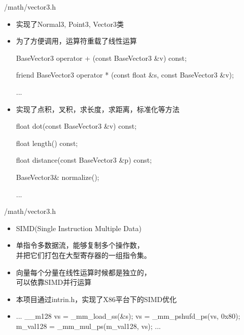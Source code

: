 \documentclass{beamer}
\begin{document}
\begin{frame} {/math/vector3.h}
\begin{itemize} [<+->]
\item 实现了Normal3, Point3, Vector3类
\item 为了方便调用，运算符重载了线性运算
\begin{semiverbatim} \small BaseVector3 operator + (const BaseVector3 \&v) const; \end{semiverbatim}
\begin{semiverbatim} \small friend BaseVector3 operator * (const float \&s, const BaseVector3 \&v); \end{semiverbatim}
\begin{semiverbatim} \small ... \end{semiverbatim}
\item 实现了点积，叉积，求长度，求距离，标准化等方法
\begin{semiverbatim} \small float dot(const BaseVector3 \&v) const; \end{semiverbatim}
\begin{semiverbatim} \small float length() const; \end{semiverbatim}
\begin{semiverbatim} \small float distance(const BaseVector3 \&p) const; \end{semiverbatim}
\begin{semiverbatim} \small BaseVector3\& normalize(); \end{semiverbatim}
\begin{semiverbatim} \small ... \end{semiverbatim}
\end{itemize}
\end{frame}

\begin{frame} {/math/vector3.h}
\begin{itemize} [<+->]
\item SIMD(Single Instruction Multiple Data)
\item 单指令多数据流，能够复制多个操作数，\\并把它们打包在大型寄存器的一组指令集。
\item 向量每个分量在线性运算时候都是独立的，\\ 可以依靠SIMD并行运算
\item 本项目通过intrin.h，实现了X86平台下的SIMD优化
\item \begin{semiverbatim} ... \newline \_\_m128 vs = \_mm\_load\_ss(\&s); \newline vs = \_mm\_pshufd\_ps(vs, 0x80); \newline m\_val128 = \_mm\_mul\_ps(m\_val128, vs); \newline ... \end{semiverbatim}
\end{itemize}
\end{frame}
\end{document}
